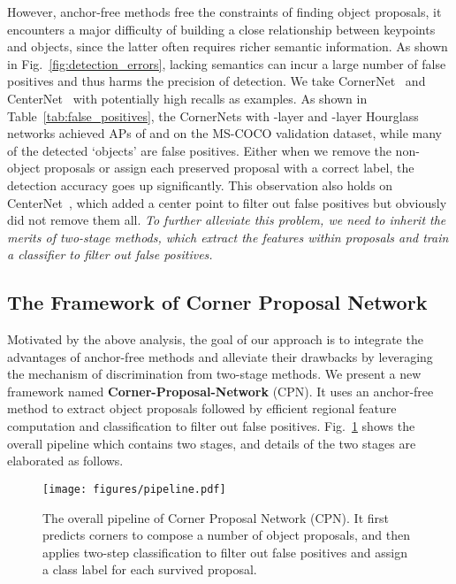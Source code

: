 \documentclass[runningheads]{llncs}
\begin{document}
However, anchor-free methods free the constraints of finding object proposals, it encounters a major difficulty of building a close relationship between keypoints and objects, since the latter often requires richer semantic information. As shown in Fig.~\ref{fig:detection_errors}, lacking semantics can incur a large number of false positives and thus harms the precision of detection. We take CornerNet~\cite{law2018cornernet} and CenterNet~\cite{duan2019centernet} with potentially high recalls as examples. As shown in Table~\ref{tab:false_positives}, the CornerNets with -layer and -layer Hourglass networks achieved APs of  and  on the MS-COCO validation dataset, while many of the detected `objects' are false positives. Either when we remove the non-object proposals or assign each preserved proposal with a correct label, the detection accuracy goes up significantly. This observation also holds on CenterNet~\cite{duan2019centernet}, which added a center point to filter out false positives but obviously did not remove them all. \textit{To further alleviate this problem, we need to inherit the merits of two-stage methods, which extract the features within proposals and train a classifier to filter out false positives.}



\vspace{-2ex}
\subsection{The Framework of Corner Proposal Network}
\label{Approach:Framework}

Motivated by the above analysis, the goal of our approach is to integrate the advantages of anchor-free methods and alleviate their drawbacks by leveraging the mechanism of discrimination from two-stage methods. We present a new framework named \textbf{Corner-Proposal-Network} (CPN). It uses an anchor-free method to extract object proposals followed by efficient regional feature computation and classification to filter out false positives. Fig.~\ref{fig:pipeline} shows the overall pipeline which contains two stages, and details of the two stages are elaborated as follows.

\begin{figure}[!t]
\centering 
\texttt{[image: figures/pipeline.pdf]}
\vspace{-5ex}
\caption{The overall pipeline of Corner Proposal Network (CPN). It first predicts corners to compose a number of object proposals, and then applies two-step classification to filter out false positives and assign a class label for each survived proposal.}
\label{fig:pipeline}
\vspace{-2ex}
\end{figure}
\end{document}
